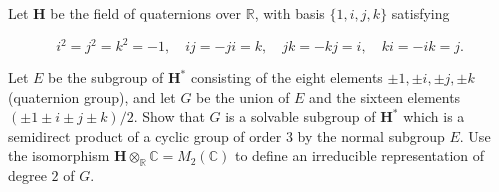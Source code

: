 Let $\mathbf{H}$ be the field of quaternions over $\mathbb{R}$, with basis $\{1, i, j, k\}$ satisfying

$$i^2 = j^2 = k^2 = -1, \quad ij = -ji = k, \quad jk = -kj = i, \quad ki = -ik = j.$$

Let $E$ be the subgroup of $\mathbf{H}^*$ consisting of the eight elements $\pm 1, \pm i, \pm j, \pm k$ (quaternion group), and let $G$ be the union of $E$ and the sixteen elements $(\pm 1 \pm i \pm j \pm k)/2$. Show that $G$ is a solvable subgroup of $\mathbf{H}^*$ which is a semidirect product of a cyclic group of order $3$ by the normal subgroup $E$. Use the isomorphism $\mathbf{H} \otimes_{\mathbb{R}} \mathbb{C} = M_2(\mathbb{C})$ to define an irreducible representation of degree $2$ of $G$.
